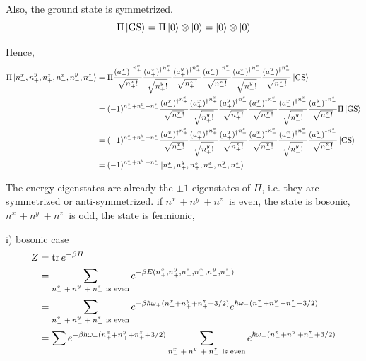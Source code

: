 \documentclass[a4paper,11pt]{article}
\begin{document}
Also, the ground state is symmetrized.
\begin{equation}
    \Pi\ket{\text{GS}} = \Pi\ket{0}\otimes\ket{0}=\ket{0}\otimes\ket{0}
\end{equation}

Hence,
\begin{align}
    \Pi\ket{n_+^x,n_+^y,n_+^z, n_-^x,n_-^y,n_-^z}
    &=\Pi\frac{{(a_+^x)^\dagger}^{n_+^x}}{\sqrt{n_+^x!}}\frac{{(a_+^x)^\dagger}^{n_+^x}}{\sqrt{n_+^y!}}\frac{{(a_+^y)^\dagger}^{n_+^z}}{\sqrt{n_+^z!}}\frac{{(a_-^x)^\dagger}^{n_-^x}}{\sqrt{n_-^x!}}\frac{{(a_-^x)^\dagger}^{n_-^x}}{\sqrt{n_-^y!}}\frac{{(a_-^y)^\dagger}^{n_-^z}}{\sqrt{n_-^z!}}\ket{\text{GS}} \\
    &=(-1)^{n_-^x+n_-^y+n_-^z}\frac{{(a_+^x)^\dagger}^{n_+^x}}{\sqrt{n_+^x!}}\frac{{(a_+^x)^\dagger}^{n_+^x}}{\sqrt{n_+^y!}}\frac{{(a_+^y)^\dagger}^{n_+^z}}{\sqrt{n_+^z!}}\frac{{(a_-^x)^\dagger}^{n_-^x}}{\sqrt{n_-^x!}}\frac{{(a_-^x)^\dagger}^{n_-^x}}{\sqrt{n_-^y!}}\frac{{(a_-^y)^\dagger}^{n_-^z}}{\sqrt{n_-^z!}}\Pi\ket{\text{GS}}\\
    &=(-1)^{n_-^x+n_-^y+n_-^z}\frac{{(a_+^x)^\dagger}^{n_+^x}}{\sqrt{n_+^x!}}\frac{{(a_+^x)^\dagger}^{n_+^x}}{\sqrt{n_+^y!}}\frac{{(a_+^y)^\dagger}^{n_+^z}}{\sqrt{n_+^z!}}\frac{{(a_-^x)^\dagger}^{n_-^x}}{\sqrt{n_-^x!}}\frac{{(a_-^x)^\dagger}^{n_-^x}}{\sqrt{n_-^y!}}\frac{{(a_-^y)^\dagger}^{n_-^z}}{\sqrt{n_-^z!}}\ket{\text{GS}}\\
    &=(-1)^{n_-^x+n_-^y+n_-^z}\ket{n_+^x,n_+^y,n_+^z, n_-^x,n_-^y,n_-^z}    
\end{align}



The energy eigenstates are already the $\pm 1$ eigenstates of $\Pi$, i.e. they are symmetrized or anti-symmetrized. if $n_-^x+n_-^y+n_-^z$ is even, the state is bosonic, $n_-^x+n_-^y+n_-^z$ is odd, the state is fermionic, 

i) bosonic case
\begin{align}
    Z &= \operatorname{tr} e^{-\beta H} \\
    &= \sum_{\text{$n_-^x+n_-^y+n_-^z$ is even}} e^{-\beta E(n_+^x,n_+^y,n_+^z, n_-^x,n_-^y,n_-^z)} \\
    &= \sum_{\text{$n_-^x+n_-^y+n_-^z$ is even}} e^{-\beta \hbar\omega_+(n_+^x + n_+^y + n_+^z + 3/2)}e^{\hbar\omega_-(n_-^x + n_-^y + n_-^z + 3/2)} \\
    &= \sum e^{-\beta \hbar\omega_+(n_+^x + n_+^y + n_+^z + 3/2)} \sum_{\text{$n_-^x+n_-^y+n_-^z$ is even}} e^{\hbar\omega_-(n_-^x + n_-^y + n_-^z + 3/2)}
\end{align}
\end{document}
